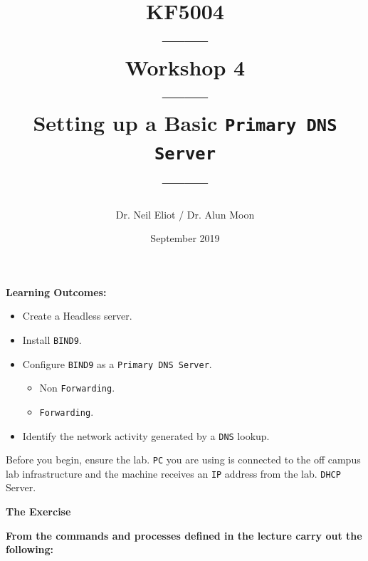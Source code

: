 \documentclass[11pt]{article}
\begin{document}
\author{Dr. Neil Eliot / Dr. Alun Moon}
\title{KF5004\\------\\Workshop 4\\------\\Setting up a Basic \texttt{Primary DNS Server}\\------}
\date{September 2019}
\maketitle

\newpage



\noindent\textbf{Learning Outcomes:}
\begin{itemize}
    \item Create a Headless server.
    \item Install \texttt{BIND9}.
    \item Configure \texttt{BIND9} as a \texttt{Primary DNS Server}.
        \begin{itemize} 
            \item Non \texttt{Forwarding}.
            \item \texttt{Forwarding}.
        \end{itemize} 
    \item Identify the network activity generated by a \texttt{DNS} lookup.
\end{itemize}


\begin{tcolorbox}[title={\textbf{Important:}}]
    Before you begin, ensure the lab. \texttt{PC} you are using is connected to the off campus lab infrastructure and the machine receives an \texttt{IP} address from the lab. \texttt{DHCP} Server.
\end{tcolorbox}
\newpage

\noindent\textbf{The Exercise}\\
\begin{tcolorbox}[colback=blue!20]
    \noindent\textbf{From the commands and processes defined in the lecture carry out the following:}
\end{tcolorbox}
\end{document}
